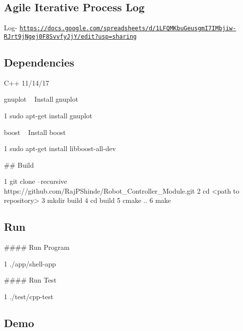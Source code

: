 \subsection*{Agile Iterative Process Log}

Log-\/ \href{https://docs.google.com/spreadsheets/d/1LFQMKbuGeusgmI7IMbjiw-RJrt9jNgej0F8SvvfyJjY/edit?usp=sharing}{\tt https\+://docs.\+google.\+com/spreadsheets/d/1\+L\+F\+Q\+M\+Kbu\+Geusgm\+I7\+I\+Mbjiw-\/\+R\+Jrt9j\+Ngej0\+F8\+Svvfy\+Jj\+Y/edit?usp=sharing}

\subsection*{Dependencies}


\begin{DoxyEnumerate}
\item C++ 11/14/17
\item gnuplot ~\newline
Install gnuplot 
\begin{DoxyCode}
1 sudo apt-get install gnuplot
\end{DoxyCode}

\item boost ~\newline
Install boost 
\begin{DoxyCode}
1 sudo apt-get install libboost-all-dev
\end{DoxyCode}

\end{DoxyEnumerate}

\#\# Build 
\begin{DoxyCode}
1 git clone --recursive https://github.com/RajPShinde/Robot\_Controller\_Module.git
2 cd <path to repository>
3 mkdir build
4 cd build
5 cmake ..
6 make
\end{DoxyCode}
 \subsection*{Run}

\#\#\#\# Run Program 
\begin{DoxyCode}
1 ./app/shell-app
\end{DoxyCode}
 \#\#\#\# Run Test 
\begin{DoxyCode}
1 ./test/cpp-test
\end{DoxyCode}
 \subsection*{Demo}

